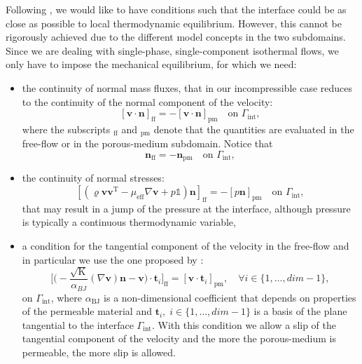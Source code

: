 Following \textcite{paper:mosthaf}, we would like to have conditions such that 
the interface could be as close as possible to local thermodynamic 
equilibrium. However, this cannot be rigorously achieved due to the 
different model concepts in the two subdomains. Since we are dealing with 
single-phase, single-component isothermal flows, we only have to impose the 
mechanical equilibrium, for which we need:
\begin{itemize}
	\item the continuity of normal mass fluxes, that in our incompressible case 
	reduces to the continuity of the normal component of the velocity:
	\begin{equation} \label{eq:contmass}
		[\mathbf{v} \cdot \mathbf{n}]_\text{ff} = - [\mathbf{v} 
		\cdot \mathbf{n}]_\text{pm} \quad \text{on $\Gamma_\text{int}$},
	\end{equation}
	where the subscripts $_\text{ff}$ and $_\text{pm}$ denote that the 
	quantities are 
	evaluated in the free-flow or in the porous-medium subdomain. Notice that
	\begin{equation}
		\mathbf{n}_\text{ff} = -\mathbf{n}_\text{pm} \quad \text{on 
		$\Gamma_\text{int}$},
	\end{equation}
	\item the continuity of normal stresses:
	\begin{equation} \label{eq:coupnormalstress}
		[(\varrho \mathbf{v} \mathbf{v}^\mathrm{T} - \mu_\text{eff} \nabla 
		\mathbf{v} + p\mathbb{1}) 
		\mathbf{n}]_\text{ff} = 
		- [p\mathbf{n}]_\text{pm} \quad \text{on $\Gamma_\text{int}$},
	\end{equation}
	that may result in a jump of the pressure at the interface, although pressure is typically a continuous thermodynamic variable,
	\item a condition for the tangential component of the velocity in the 
	free-flow and in particular we use the one proposed by \textcite{inter:bj}:
	\begin{equation}
		\bigg[ \bigg( -\frac{\sqrt{\mathrm{K}}}{\alpha_{BJ}} (\nabla \mathbf{v}) 
		\mathbf{n} - \mathbf{v} \bigg) \cdot \mathbf{t}_i \bigg]_\text{ff} = 
		[\mathbf{v} \cdot \mathbf{t}_i]_\text{pm}, \quad \forall i \in \{1, 
		\dots, dim - 1\},
	\end{equation}
	on $\Gamma_\text{int}$, where $\alpha_\text{BJ}$ is a non-dimensional 
	coefficient that depends on 
	properties of the permeable material and $\mathbf{t}_i, \; 
	i \in \{1, \dots, dim-1\}$ is a basis of the plane tangential to the 
	interface $\Gamma_\text{int}$. With this condition we allow a slip of the 
	tangential component of the velocity and the more the porous-medium is 
	permeable, the more slip is allowed.
	

\end{itemize}
